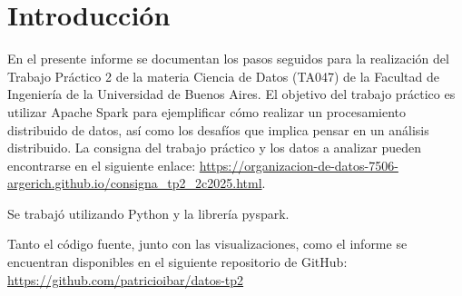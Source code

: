 \section{Introducción}
En el presente informe se documentan los pasos seguidos para la realización del Trabajo Práctico 2 de la materia Ciencia de Datos (TA047) de la Facultad de Ingeniería de la Universidad de Buenos Aires. El objetivo del trabajo práctico es utilizar Apache Spark para ejemplificar cómo realizar un procesamiento distribuido de datos, así como los desafíos que implica pensar en un análisis distribuido.  La consigna del trabajo práctico y los datos a analizar pueden encontrarse en el siguiente enlace: \url{https://organizacion-de-datos-7506-argerich.github.io/consigna_tp2_2c2025.html}.

Se trabajó utilizando Python y la librería pyspark.

Tanto el código fuente, junto con las visualizaciones, como el informe se encuentran disponibles en el siguiente repositorio de GitHub: \url{https://github.com/patricioibar/datos-tp2}